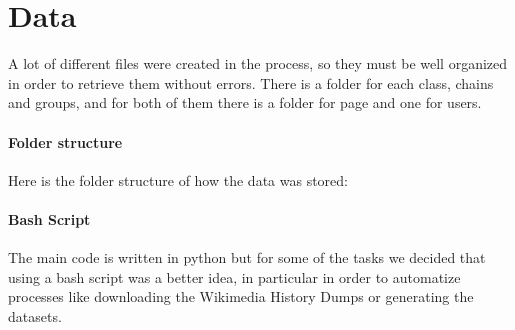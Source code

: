 \section{Data}
A lot of different files were created in the process, so they must be well organized in order to retrieve them
without errors. There is a folder for each class, chains and groups, and for both of them there is
a folder for page and one for users.

\paragraph*{Folder structure}
Here is the folder structure of how the data was stored:  


\paragraph*{Bash Script}
The main code is written in python but for some of the tasks we decided that using a bash
script was a better idea, in particular in order to automatize processes like downloading the Wikimedia History Dumps or
generating the datasets.





